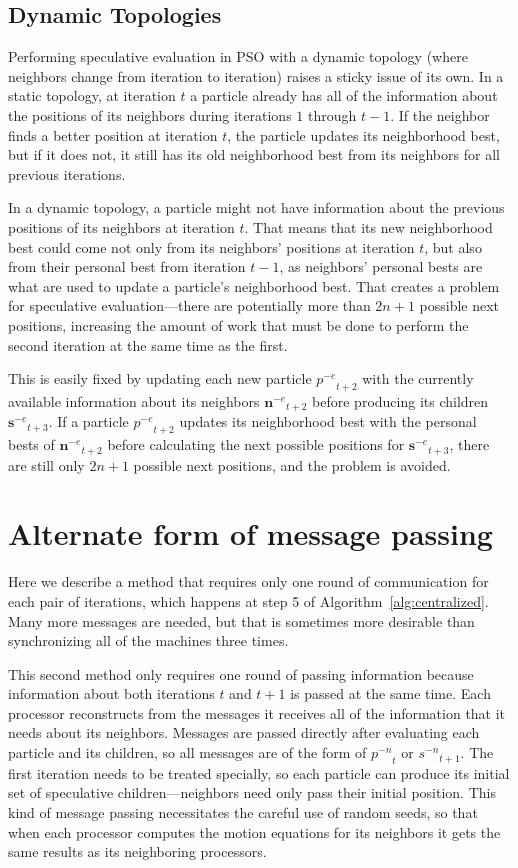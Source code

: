 \documentclass[smallcondensed]{svjour3}
\newcommand{\alg}[1]{Algorithm~\ref{alg:#1}}
\providecommand{\noeval}[1]{\ensuremath{#1^{-e}}}
\providecommand{\nonbest}[1]{\ensuremath{#1^{-n}}}
\providecommand{\p}{\ensuremath{p}}
\providecommand{\s}{\ensuremath{s}}
\providecommand{\sset}{\ensuremath{\mathbf{s}}}
\providecommand{\nset}{\ensuremath{\mathbf{n}}}
\begin{document}
\subsection{Dynamic Topologies}

Performing speculative evaluation in PSO with a dynamic topology (where
neighbors change from iteration to iteration) raises a sticky issue of its own.
In a static topology, at iteration $t$ a particle already has all of the
information about the positions of its neighbors during iterations $1$ through
$t-1$.  If the neighbor finds a better position at iteration $t$, the particle
updates its neighborhood best, but if it does not, it still has its old
neighborhood best from its neighbors for all previous iterations.

In a dynamic topology, a particle might not have information about the previous
positions of its neighbors at iteration $t$.  That means that its new
neighborhood best could come not only from its neighbors' positions at
iteration $t$, but also from their personal best from iteration $t-1$, as
neighbors' personal bests are what are used to update a particle's neighborhood
best.  That creates a problem for speculative evaluation---there are
potentially more than $2n+1$ possible next positions, increasing the amount of
work that must be done to perform the second iteration at the same time as the
first.

This is easily fixed by updating each new particle $\noeval{\p}_{t+2}$ with the
currently available information about its neighbors $\noeval{\nset}_{t+2}$
before producing its children $\noeval{\sset}_{t+3}$.  If a particle
$\noeval{\p}_{t+2}$ updates its neighborhood best with the personal bests of
$\noeval{\nset}_{t+2}$ before calculating the next possible positions for
$\noeval{\sset}_{t+3}$, there are still only $2n+1$ possible next positions,
and the problem is avoided.

\section{Alternate form of message passing}

Here we describe a method that requires only one round of communication for
each pair of iterations, which happens at step 5 of \alg{centralized}.  Many
more messages are needed, but that is sometimes more desirable than
synchronizing all of the machines three times.

This second method only requires one round of passing information because
information about both iterations $t$ and $t+1$ is passed at the same time.
Each processor reconstructs from the messages it receives all of the
information that it needs about its neighbors.  Messages are passed directly
after evaluating each particle and its children, so all messages are of the
form of $\nonbest{\p}_t$ or $\nonbest{\s}_{t+1}$.  The first iteration needs to
be treated specially, so each particle can produce its initial set of
speculative children---neighbors need only pass their initial position.  This
kind of message passing necessitates the careful use of random seeds, so that
when each processor computes the motion equations for its neighbors it gets the
same results as its neighboring processors.
\end{document}
